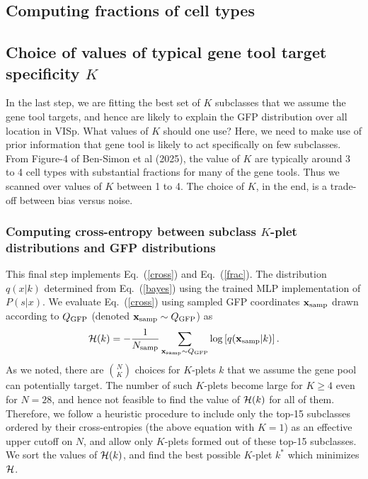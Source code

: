 \documentclass{article}
\newcommand\beq{\begin{equation}}
\newcommand\eeq[1]{\label{#1}\end{equation}}
\newcommand\eqn[1]{Eq.\ (\ref{#1})}
\begin{document}
\subsection{Computing fractions of cell types}

\subsection{Choice of values of typical gene tool target specificity $K$} 

In the last step, we are fitting the best set of $K$ subclasses
that we assume the gene tool targets, and hence are likely to explain
the GFP distribution over all location in VISp. What values of $K$
should one use?  Here, we need to make use of prior information
that gene tool is likely to act specifically on few subclasses.
From Figure-4 of Ben-Simon et al (2025), the value of $K$ are
typically around 3 to 4 cell types with substantial fractions for
many of the gene tools.  Thus we scanned over values of $K$ between
1 to 4. The choice of $K$, in the end, is a trade-off between bias
versus noise.

\subsubsection{Computing cross-entropy between subclass $K$-plet distributions and GFP distributions}

This final step implements \eqn{cross} and \eqn{frac}. The distribution 
$q(x|k)$ determined from \eqn{bayes} using the trained MLP implementation of 
$P(s|x)$. We evaluate \eqn{cross} using sampled GFP coordinates $\mathbf{x}_{\rm samp}$ 
drawn according to $Q_{\rm GFP}$ (denoted $\mathbf{x}_{\rm samp}\sim Q_{\rm GFP}$) as 
\beq
{\cal H}(k) = -\frac{1}{N_{\rm samp}} \sum_{\mathbf{x}_{\rm samp}\sim Q_{\rm GFP} } \log\left[ q(\mathbf{x}_{\rm samp} |k)\right].
\eeq{mccross}
As we noted, there are $\binom{N}{K}$ choices for $K$-plets $k$
that we assume the gene pool can potentially target. The number of
such $K$-plets become large for $K\ge 4$ even for $N=28$, and hence
not feasible to find the value of ${\cal H}(k)$ for all of them.
Therefore, we follow a heuristic procedure to include only the
top-15 subclasses ordered by their cross-entropies (the above
equation with $K=1$) as an effective upper cutoff on $N$, and allow
only $K$-plets formed out of these top-15 subclasses.  We sort the
values of ${\cal H}(k)$, and find the best possible $K$-plet $k^*$
which minimizes ${\cal H}$.
\end{document}
